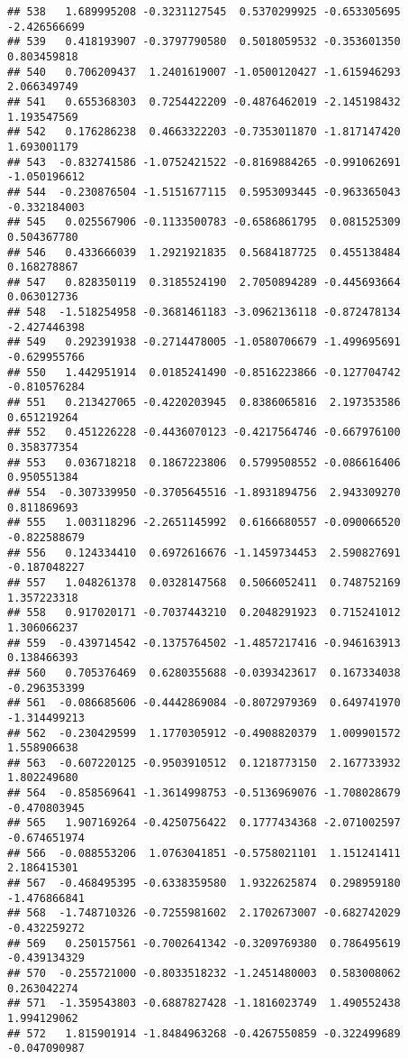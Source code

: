 \documentclass[
]{article}
\begin{document}
\begin{verbatim}
## 538   1.689995208 -0.3231127545  0.5370299925 -0.653305695 -2.426566699
## 539   0.418193907 -0.3797790580  0.5018059532 -0.353601350  0.803459818
## 540   0.706209437  1.2401619007 -1.0500120427 -1.615946293  2.066349749
## 541   0.655368303  0.7254422209 -0.4876462019 -2.145198432  1.193547569
## 542   0.176286238  0.4663322203 -0.7353011870 -1.817147420  1.693001179
## 543  -0.832741586 -1.0752421522 -0.8169884265 -0.991062691 -1.050196612
## 544  -0.230876504 -1.5151677115  0.5953093445 -0.963365043 -0.332184003
## 545   0.025567906 -0.1133500783 -0.6586861795  0.081525309  0.504367780
## 546   0.433666039  1.2921921835  0.5684187725  0.455138484  0.168278867
## 547   0.828350119  0.3185524190  2.7050894289 -0.445693664  0.063012736
## 548  -1.518254958 -0.3681461183 -3.0962136118 -0.872478134 -2.427446398
## 549   0.292391938 -0.2714478005 -1.0580706679 -1.499695691 -0.629955766
## 550   1.442951914  0.0185241490 -0.8516223866 -0.127704742 -0.810576284
## 551   0.213427065 -0.4220203945  0.8386065816  2.197353586  0.651219264
## 552   0.451226228 -0.4436070123 -0.4217564746 -0.667976100  0.358377354
## 553   0.036718218  0.1867223806  0.5799508552 -0.086616406  0.950551384
## 554  -0.307339950 -0.3705645516 -1.8931894756  2.943309270  0.811869693
## 555   1.003118296 -2.2651145992  0.6166680557 -0.090066520 -0.822588679
## 556   0.124334410  0.6972616676 -1.1459734453  2.590827691 -0.187048227
## 557   1.048261378  0.0328147568  0.5066052411  0.748752169  1.357223318
## 558   0.917020171 -0.7037443210  0.2048291923  0.715241012  1.306066237
## 559  -0.439714542 -0.1375764502 -1.4857217416 -0.946163913  0.138466393
## 560   0.705376469  0.6280355688 -0.0393423617  0.167334038 -0.296353399
## 561  -0.086685606 -0.4442869084 -0.8072979369  0.649741970 -1.314499213
## 562  -0.230429599  1.1770305912 -0.4908820379  1.009901572  1.558906638
## 563  -0.607220125 -0.9503910512  0.1218773150  2.167733932  1.802249680
## 564  -0.858569641 -1.3614998753 -0.5136969076 -1.708028679 -0.470803945
## 565   1.907169264 -0.4250756422  0.1777434368 -2.071002597 -0.674651974
## 566  -0.088553206  1.0763041851 -0.5758021101  1.151241411  2.186415301
## 567  -0.468495395 -0.6338359580  1.9322625874  0.298959180 -1.476866841
## 568  -1.748710326 -0.7255981602  2.1702673007 -0.682742029 -0.432259272
## 569   0.250157561 -0.7002641342 -0.3209769380  0.786495619 -0.439134329
## 570  -0.255721000 -0.8033518232 -1.2451480003  0.583008062  0.263042274
## 571  -1.359543803 -0.6887827428 -1.1816023749  1.490552438  1.994129062
## 572   1.815901914 -1.8484963268 -0.4267550859 -0.322499689 -0.047090987

\end{verbatim}
\end{document}
